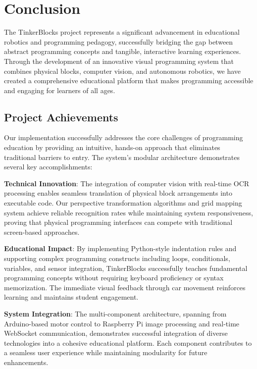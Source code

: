 \chapter{Conclusion}

The TinkerBlocks project represents a significant advancement in educational robotics and programming pedagogy, successfully bridging the gap between abstract programming concepts and tangible, interactive learning experiences. Through the development of an innovative visual programming system that combines physical blocks, computer vision, and autonomous robotics, we have created a comprehensive educational platform that makes programming accessible and engaging for learners of all ages.

\section{Project Achievements}

Our implementation successfully addresses the core challenges of programming education by providing an intuitive, hands-on approach that eliminates traditional barriers to entry. The system's modular architecture demonstrates several key accomplishments:

\textbf{Technical Innovation}: The integration of computer vision with real-time OCR processing enables seamless translation of physical block arrangements into executable code. Our perspective transformation algorithms and grid mapping system achieve reliable recognition rates while maintaining system responsiveness, proving that physical programming interfaces can compete with traditional screen-based approaches.

\textbf{Educational Impact}: By implementing Python-style indentation rules and supporting complex programming constructs including loops, conditionals, variables, and sensor integration, TinkerBlocks successfully teaches fundamental programming concepts without requiring keyboard proficiency or syntax memorization. The immediate visual feedback through car movement reinforces learning and maintains student engagement.

\textbf{System Integration}: The multi-component architecture, spanning from Arduino-based motor control to Raspberry Pi image processing and real-time WebSocket communication, demonstrates successful integration of diverse technologies into a cohesive educational platform. Each component contributes to a seamless user experience while maintaining modularity for future enhancements.

